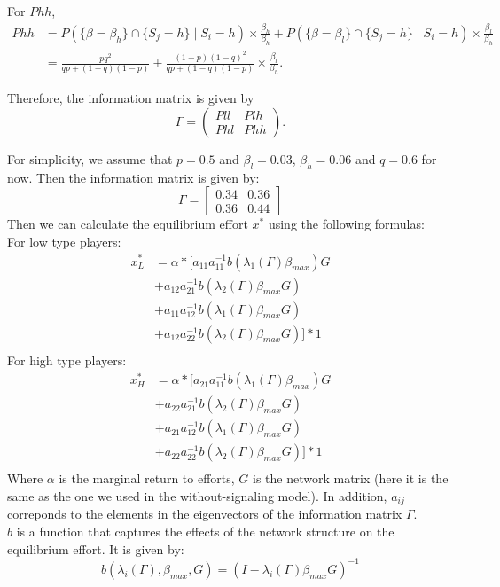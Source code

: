\documentclass[12pt]{article}
\begin{document}
For \( Phh \),
\begin{align*}
Phh &= P\left( \{\beta = \beta_h\} \cap \{S_j = h\} \mid S_i = h \right) \times \frac{\beta_h}{\beta_h}
+ P\left( \{\beta = \beta_l\} \cap \{S_j = h\} \mid S_i = h \right) \times \frac{\beta_l}{\beta_h} \\
&= \frac{pq^2}{qp + (1-q)(1-p)}
+ \frac{(1-p)(1-q)^2}{qp + (1-q)(1-p)} \times \frac{\beta_l}{\beta_h}.
\end{align*}

Therefore, the information matrix is given by
\[
\Gamma = 
\begin{pmatrix}
Pll & Plh \\
Phl & Phh
\end{pmatrix}.
\]

For simplicity, we assume that $p=0.5$ and $\beta_l=0.03$, $\beta_h=0.06$ and $q = 0.6$ for now. Then the information matrix is given by:
\[
\Gamma =
\begin{bmatrix}
0.34 & 0.36 \\
0.36 & 0.44
\end{bmatrix}
\]
Then we can calculate the equilibrium effort $x^*$ using the following formulas:\\
For low type players:
\begin{align*}
x_L^* &= \alpha * [a_{11} a_{11}^{-1} b(\lambda_1(\Gamma)\beta_{max})G\\
&+ a_{12} a_{21}^{-1} b(\lambda_2(\Gamma)\beta_{max}G)\\
&+ a_{11} a_{12}^{-1} b(\lambda_1(\Gamma)\beta_{max}G)\\
&+ a_{12} a_{22}^{-1} b(\lambda_2(\Gamma)\beta_{max}G)] * 1\\
\end{align*}
For high type players:
\begin{align*}
x_H^* &= \alpha * [a_{21} a_{11}^{-1} b(\lambda_1(\Gamma)\beta_{max})G\\
&+ a_{22} a_{21}^{-1} b(\lambda_2(\Gamma)\beta_{max}G)\\
&+ a_{21} a_{12}^{-1} b(\lambda_1(\Gamma)\beta_{max}G)\\
&+ a_{22} a_{22}^{-1} b(\lambda_2(\Gamma)\beta_{max}G)] * 1 \\
\end{align*}
Where $\alpha$ is the marginal return to efforts, $G$ is the network matrix (here it is the same as the one we used in the without-signaling model). In addition, $a_{ij}$ correponds to the elements in the eigenvectors of the information matrix $\Gamma$.\\
$b$ is a function that captures the effects of the network structure on the equilibrium effort. It is given by:
\[
b(\lambda_i(\Gamma),\beta_{max},G) = (I - \lambda_i(\Gamma)\beta_{max}G)^{-1}
\]
  
\end{document}
